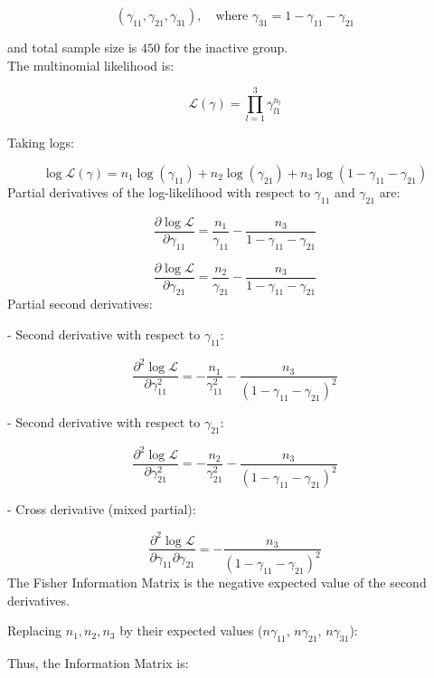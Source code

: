 \documentclass[12pt]{article}
\begin{document}
\begin{flushleft}
\[
(\gamma_{11}, \gamma_{21}, \gamma_{31}), \quad \text{where } \gamma_{31} = 1 - \gamma_{11} - \gamma_{21}
\]

and total sample size is $450$ for the inactive group.\\
The multinomial likelihood is:

\[
\mathcal{L}(\gamma) = \prod_{l=1}^3 \gamma_{l1}^{n_l}
\]

Taking logs:

\[
\log \mathcal{L}(\gamma) = n_1 \log(\gamma_{11}) + n_2 \log(\gamma_{21}) + n_3 \log(1 - \gamma_{11} - \gamma_{21})
\]
Partial derivatives of the log-likelihood with respect to $\gamma_{11}$ and $\gamma_{21}$ are:

\[
\frac{\partial \log \mathcal{L}}{\partial \gamma_{11}} = \frac{n_1}{\gamma_{11}} - \frac{n_3}{1 - \gamma_{11} - \gamma_{21}}
\]

\[
\frac{\partial \log \mathcal{L}}{\partial \gamma_{21}} = \frac{n_2}{\gamma_{21}} - \frac{n_3}{1 - \gamma_{11} - \gamma_{21}}
\]
Partial second derivatives:

- Second derivative with respect to \(\gamma_{11}\):

\[
\frac{\partial^2 \log \mathcal{L}}{\partial \gamma_{11}^2} = -\frac{n_1}{\gamma_{11}^2} - \frac{n_3}{(1-\gamma_{11}-\gamma_{21})^2}
\]

- Second derivative with respect to \(\gamma_{21}\):

\[
\frac{\partial^2 \log \mathcal{L}}{\partial \gamma_{21}^2} = -\frac{n_2}{\gamma_{21}^2} - \frac{n_3}{(1-\gamma_{11}-\gamma_{21})^2}
\]

- Cross derivative (mixed partial):

\[
\frac{\partial^2 \log \mathcal{L}}{\partial \gamma_{11} \partial \gamma_{21}} = -\frac{n_3}{(1-\gamma_{11}-\gamma_{21})^2}
\]
The Fisher Information Matrix is the negative expected value of the second derivatives.

Replacing \(n_1, n_2, n_3\) by their expected values (\(n \gamma_{11}\), \(n \gamma_{21}\), \(n \gamma_{31}\)):

Thus, the Information Matrix is:


\end{flushleft}
\end{document}
